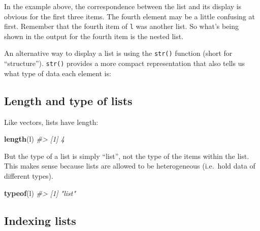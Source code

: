 \documentclass[]{book}
\newenvironment{Shaded}{\begin{snugshade}}{\end{snugshade}}
\newcommand{\CommentTok}[1]{\textcolor[rgb]{0.56,0.35,0.01}{\textit{#1}}}
\newcommand{\KeywordTok}[1]{\textcolor[rgb]{0.13,0.29,0.53}{\textbf{#1}}}
\newcommand{\NormalTok}[1]{#1}
\theoremstyle{definition}
\theoremstyle{definition}
\theoremstyle{definition}
\theoremstyle{remark}
\begin{document}
In the example above, the correspondence between the list and its
display is obvious for the first three items. The fourth element may be
a little confusing at first. Remember that the fourth item of \texttt{l}
was another list. So what's being shown in the output for the fourth
item is the nested list.

An alternative way to display a list is using the \texttt{str()}
function (short for ``structure''). \texttt{str()} provides a more
compact representation that also tells us what type of data each element
is:

\begin{Shaded}
\end{Shaded}

\hypertarget{length-and-type-of-lists}{%
\subsection{Length and type of lists}\label{length-and-type-of-lists}}

Like vectors, lists have length:

\begin{Shaded}
\begin{Highlighting}[]
\KeywordTok{length}\NormalTok{(l)}
\CommentTok{#> [1] 4}
\end{Highlighting}
\end{Shaded}

But the type of a list is simply ``list'', not the type of the items
within the list. This makes sense because lists are allowed to be
heterogeneous (i.e.~hold data of different types).

\begin{Shaded}
\begin{Highlighting}[]
\KeywordTok{typeof}\NormalTok{(l)}
\CommentTok{#> [1] "list"}
\end{Highlighting}
\end{Shaded}

\hypertarget{indexing-lists}{%
\subsection{Indexing lists}\label{indexing-lists}}
\end{document}
